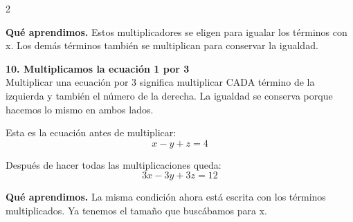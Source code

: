 \documentclass[11pt,a4paper,landscape]{article}
\begin{document}
\begin{multicols*}{2}
\begin{minipage}{\linewidth}
\par{}\par\smallskip
\par\smallskip\textbf{Qué aprendimos.} Estos multiplicadores se eligen para igualar los términos con x. Los demás términos también se multiplican para conservar la igualdad.
\end{minipage}\par\medskip
\noindent\begin{minipage}{\linewidth}\textbf{10. Multiplicamos la ecuación 1 por 3}\\[2pt]Multiplicar una ecuación por 3 significa multiplicar CADA término de la izquierda y también el número de la derecha. La igualdad se conserva porque hacemos lo mismo en ambos lados.
\par\smallskip Esta es la ecuación antes de multiplicar:
\[x - y + z = 4\]
\par{}\par\smallskip
\par\smallskip Después de hacer todas las multiplicaciones queda:
\[3x - 3y + 3z = 12\]
\par\smallskip\textbf{Qué aprendimos.} La misma condición ahora está escrita con los términos multiplicados. Ya tenemos el tamaño que buscábamos para x.

\end{minipage}
\end{multicols*}
\end{document}
